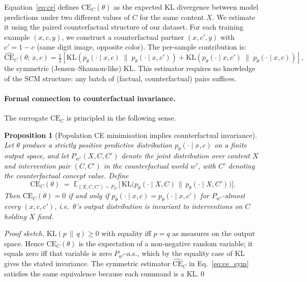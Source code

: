 \documentclass{article}
\newtheorem{proposition}{Proposition}
\newcommand{\CE}{\mathrm{CE}}
\newcommand{\ptheta}{p_{\theta}}
\newcommand{\EE}{\mathbb{E}}
\begin{document}
Equation~\eqref{eq:ce} defines $\CE_C(\theta)$ as the expected KL divergence
between model predictions under two different values of $C$ for the same content
$X$.  We estimate it using the paired counterfactual structure of our dataset.
For each training example $(x, c, y)$, we construct a counterfactual partner
$(x, c', y)$ with $c' = 1 - c$ (same digit image, opposite color).  The
per-sample contribution is:
\begin{equation}
  \widehat{\CE}_C(\theta;\, x, c) =
    \tfrac{1}{2}\left[
      \mathrm{KL}\!\left(\ptheta(\cdot \mid x, c)\;\big\|\;\ptheta(\cdot \mid x, c')\right)
      + \mathrm{KL}\!\left(\ptheta(\cdot \mid x, c')\;\big\|\;\ptheta(\cdot \mid x, c)\right)
    \right],
  \label{eq:ce_sym}
\end{equation}
the symmetric (Jensen--Shannon-like) KL.  This estimator requires no knowledge
of the SCM structure: any batch of (factual, counterfactual) pairs suffices.

\paragraph{Formal connection to counterfactual invariance.}
The surrogate $\CE_C$ is principled in the following sense.

\begin{proposition}[Population CE minimisation implies counterfactual invariance]
\label{prop:ce-invariance}
Let $\theta$ produce a strictly positive predictive distribution
$\ptheta(\cdot\mid x,c)$ on a finite output space, and let
$P_{w^\tau}(X, C, C')$ denote the joint distribution over content $X$ and
intervention pair $(C, C')$ in the counterfactual world $w^\tau$, with $C'$
denoting the counterfactual concept value.  Define
\[
  \CE_C(\theta) \;=\;
  \EE_{(X,C,C')\sim P_{w^\tau}}\!\bigl[\,\mathrm{KL}\bigl(\ptheta(\cdot\mid X, C)\,\big\|\,\ptheta(\cdot\mid X, C')\bigr)\bigr].
\]
Then $\CE_C(\theta) = 0$ if and only if
$\ptheta(\cdot\mid x, c) = \ptheta(\cdot\mid x, c')$ for $P_{w^\tau}$-almost every
$(x, c, c')$, i.e.\ $\theta$'s output distribution is invariant to interventions on $C$ holding $X$ fixed.
\end{proposition}

\begin{proof}[Proof sketch]
$\mathrm{KL}(p\,\|\,q) \geq 0$ with equality iff $p = q$ as measures on the
output space.  Hence $\CE_C(\theta)$ is the expectation of a non-negative random
variable; it equals zero iff that variable is zero $P_{w^\tau}$-a.s., which by
the equality case of KL gives the stated invariance.  The symmetric estimator
$\widehat{\CE}_C$ in Eq.~\eqref{eq:ce_sym} satisfies the same equivalence
because each summand is a KL.\qed
\end{proof}
\end{document}
